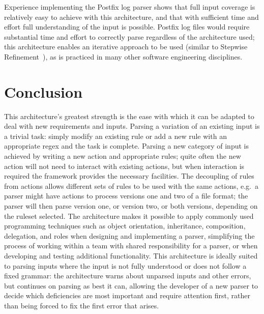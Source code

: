 \documentclass{svmult}
\begin{document}
Experience implementing the Postfix log parser shows that full input
coverage is relatively easy to achieve with this architecture, and that
with sufficient time and effort full understanding of the input is
possible.  Postfix log files would require substantial time and effort to
correctly parse regardless of the architecture used; this architecture
enables an iterative approach to be used (similar to Stepwise
Refinement~\cite{stepwise-refinement}), as is practiced in many other
software engineering disciplines.

\section{Conclusion}

This architecture's greatest strength is the ease with which it can be
adapted to deal with new requirements and inputs.  Parsing a variation of
an existing input is a trivial task: simply modify an existing rule or add
a new rule with an appropriate regex and the task is complete.  Parsing a
new category of input is achieved by writing a new action and appropriate
rules; quite often the new action will not need to interact with existing
actions, but when interaction is required the framework provides the
necessary facilities.  The decoupling of rules from actions allows
different sets of rules to be used with the same actions, e.g.\ a parser
might have actions to process versions one and two of a file format; the
parser will then parse version one, or version two, or both versions,
depending on the ruleset selected.  The architecture makes it possible to
apply commonly used programming techniques such as object orientation,
inheritance, composition, delegation, and roles when designing and
implementing a parser, simplifying the process of working within a team
with shared responsibility for a parser, or when developing and testing
additional functionality.  This architecture is ideally suited to parsing
inputs where the input is not fully understood or does not follow a fixed
grammar: the architecture warns about unparsed inputs and other errors, but
continues on parsing as best it can, allowing the developer of a new parser
to decide which deficiencies are most important and require attention
first, rather than being forced to fix the first error that arises.
\end{document}
